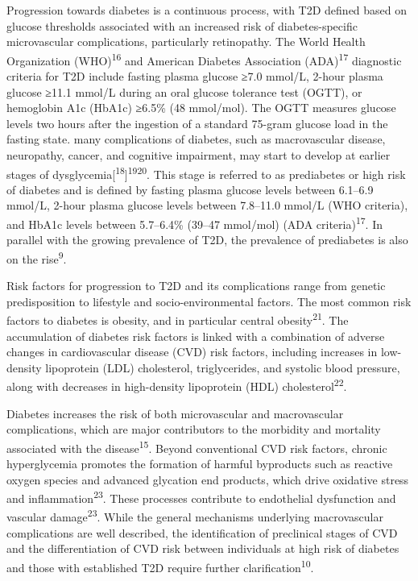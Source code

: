 \documentclass[
  a4paper,
  headsepline=true,
  open=any]{scrbook}
\begin{document}
Progression towards diabetes is a continuous process, with T2D defined
based on glucose thresholds associated with an increased risk of
diabetes-specific microvascular complications, particularly retinopathy.
The World Health Organization (WHO)\textsuperscript{16} and American
Diabetes Association (ADA)\textsuperscript{17} diagnostic criteria for
T2D include fasting plasma glucose ≥7.0 mmol/L, 2-hour plasma glucose
≥11.1 mmol/L during an oral glucose tolerance test (OGTT), or hemoglobin
A1c (HbA1c) ≥6.5\% (48 mmol/mol). The OGTT measures glucose levels two
hours after the ingestion of a standard 75-gram glucose load in the
fasting state. many complications of diabetes, such as macrovascular
disease, neuropathy, cancer, and cognitive impairment, may start to
develop at earlier stages of
dysglycemia{[}\textsuperscript{18}{]}\textsuperscript{19}\textsuperscript{20}.
This stage is referred to as prediabetes or high risk of diabetes and is
defined by fasting plasma glucose levels between 6.1--6.9 mmol/L, 2-hour
plasma glucose levels between 7.8--11.0 mmol/L (WHO criteria), and HbA1c
levels between 5.7--6.4\% (39--47 mmol/mol) (ADA
criteria)\textsuperscript{17}. In parallel with the growing prevalence
of T2D, the prevalence of prediabetes is also on the
rise\textsuperscript{9}.

Risk factors for progression to T2D and its complications range from
genetic predisposition to lifestyle and socio-environmental factors. The
most common risk factors to diabetes is obesity, and in particular
central obesity\textsuperscript{21}. The accumulation of diabetes risk
factors is linked with a combination of adverse changes in
cardiovascular disease (CVD) risk factors, including increases in
low-density lipoprotein (LDL) cholesterol, triglycerides, and systolic
blood pressure, along with decreases in high-density lipoprotein (HDL)
cholesterol\textsuperscript{22}.

Diabetes increases the risk of both microvascular and macrovascular
complications, which are major contributors to the morbidity and
mortality associated with the disease\textsuperscript{15}. Beyond
conventional CVD risk factors, chronic hyperglycemia promotes the
formation of harmful byproducts such as reactive oxygen species and
advanced glycation end products, which drive oxidative stress and
inflammation\textsuperscript{23}. These processes contribute to
endothelial dysfunction and vascular damage\textsuperscript{23}. While
the general mechanisms underlying macrovascular complications are well
described, the identification of preclinical stages of CVD and the
differentiation of CVD risk between individuals at high risk of diabetes
and those with established T2D require further
clarification\textsuperscript{10}.
\end{document}
